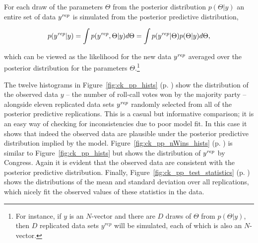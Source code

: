 For each draw of the parameters $\Theta$ from the posterior distribution $p(\Theta | y)$ an entire set of data $y^{\it rep} $ is simulated from the posterior predictive distribution,

\begin{equation*}
 p(y^{\it rep} | y) = \int p(y^{\it rep}, \Theta | y) d\Theta = \int p(y^{\it rep} | \Theta) p(\Theta | y) d\Theta,
\end{equation*}

\noindent which can be viewed as the likelihood for the new data $y^{\it rep}$ averaged over the posterior distribution for the parameters $\Theta$.\footnote{For instance, if $y$ is an $N$-vector and there are $D$ draws of $\Theta$ from $p(\Theta | y)$, then $D$ replicated data sets $y^{rep}$ will be simulated, each of which is also an $N$-vector.}

The twelve histograms in Figure~\ref{fig:ck_pp_hists} (p. \pageref{fig:ck_pp_hists}) show the distribution of the observed data $y$ -- the number of roll-call votes won by the majority party -- alongside eleven replicated data sets $y^{\it rep}$ randomly selected from all of the posterior predictive replications. This is a casual but informative comparison; it is an easy way of checking for inconsistencies due to poor model fit. In this case it shows that indeed the observed data are plausible under the posterior predictive distribution implied by the model. Figure~\ref{fig:ck_pp_nWins_hists} (p. \pageref{fig:ck_pp_nWins_hists}) is similar to Figure~\ref{fig:ck_pp_hists} but shows the distribution of $y^{\it rep}$ by Congress. Again it is evident that the observed data are consistent with the posterior predictive distribution. Finally, Figure~\ref{fig:ck_pp_test_statistics} (p. \pageref{fig:ck_pp_test_statistics}) shows the distributions of the mean and standard deviation over all replications, which nicely fit the observed values of these statistics in the data. 



